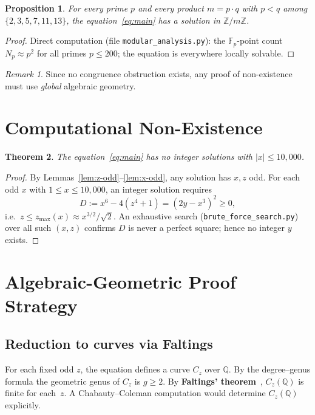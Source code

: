 \documentclass[12pt,a4paper]{article}
\newtheorem{theorem}{Theorem}
\newtheorem{proposition}[theorem]{Proposition}
\theoremstyle{remark}
\newtheorem*{remark}{Remark}
\begin{document}
\begin{proposition}\label{prop:local}
For every prime $p$ and every product $m = p\cdot q$ with $p<q$ among
$\{2,3,5,7,11,13\}$, the equation~\eqref{eq:main} has a solution in
$\mathbb{Z}/m\mathbb{Z}$.
\end{proposition}

\begin{proof}
Direct computation (file \texttt{modular\_analysis.py}):
the $\mathbb{F}_p$-point count $N_p\approx p^2$ for all primes $p\le 200$;
the equation is everywhere locally solvable.
\end{proof}

\begin{remark}
Since no congruence obstruction exists, any proof of non-existence
must use \emph{global} algebraic geometry.
\end{remark}

\section{Computational Non-Existence}

\begin{theorem}\label{thm:comp}
The equation~\eqref{eq:main} has no integer solutions with $|x|\le 10{,}000$.
\end{theorem}

\begin{proof}
By Lemmas~\ref{lem:z-odd}--\ref{lem:x-odd}, any solution has $x,z$ odd.
For each odd $x$ with $1\le x\le 10{,}000$, an integer solution requires
\[
  D := x^6 - 4(z^4+1) = (2y - x^3)^2 \ge 0,
\]
i.e.\ $z\le z_{\max}(x) \approx x^{3/2}/\sqrt{2}$.
An exhaustive search (\texttt{brute\_force\_search.py}) over all such $(x,z)$
confirms $D$ is never a perfect square; hence no integer $y$ exists.
\end{proof}

\section{Algebraic-Geometric Proof Strategy}

\subsection*{Reduction to curves via Faltings}

For each fixed odd $z$, the equation defines a curve $C_z$ over $\mathbb{Q}$.
By the degree--genus formula the geometric genus of $C_z$ is $g\ge 2$.
By \textbf{Faltings' theorem}~\cite{Faltings1983}, $C_z(\mathbb{Q})$ is finite
for each~$z$.  A Chabauty--Coleman computation would determine
$C_z(\mathbb{Q})$ explicitly.
\end{document}
